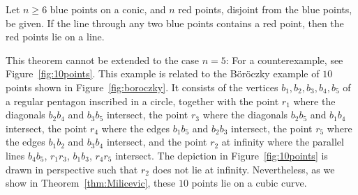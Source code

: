 \documentclass[a4paper,11pt,leqno]{article}
\begin{document}
\begin{theorem}\label{thm:conic-line}
Let $n\geq 6$ blue points on a conic, and $n$ red points, disjoint from the blue points, be given.
If the line through any two blue points contains a red point, then the red points lie on a line.
\end{theorem}
This theorem cannot be extended to the case $n=5$: 
For a counterexample, see Figure~\ref{fig:10points}.
This example is related to the B\"or\"oczky example of $10$ points shown in Figure~\ref{fig:boroczky}.
It consists of the vertices $b_1,b_2,b_3,b_4,b_5$ of a regular pentagon inscribed in a circle, together with the point $r_1$ where the diagonals $b_2b_4$ and $b_3b_5$ intersect, the point $r_3$ where the diagonals $b_2b_5$ and $b_1b_4$ intersect, the point $r_4$ where the edges $b_1b_5$ and $b_2b_3$ intersect, the point $r_5$ where the edges $b_1b_2$ and $b_3b_4$ intersect, and the point $r_2$ at infinity where the parallel lines $b_4b_5$, $r_1r_3$, $b_1b_3$, $r_4r_5$ intersect.
The depiction in Figure~\ref{fig:10points} is drawn in perspective such that $r_2$ does not lie at infinity.
Nevertheless, as we show in Theorem~\ref{thm:Milicevic}, these $10$ points lie on a cubic curve.
\end{document}
